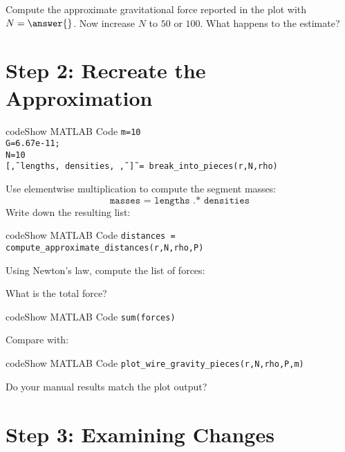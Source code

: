 \documentclass{ximera}
\begin{document}
\begin{problem}
Compute the approximate gravitational force reported in the plot with $N=\answer{}$.  
Now increase $N$ to $50$ or $100$. What happens to the estimate? 
\end{problem}

\section*{Step 2: Recreate the Approximation}

\begin{expandable}{code}{Show MATLAB Code}
\texttt{m=10}\\
\texttt{G=6.67e-11;}\\
\texttt{N=10}\\
\texttt{[\~, lengths, densities, \~, \~] = break\_into\_pieces(r,N,rho)}
\end{expandable}

\begin{problem}
Use elementwise multiplication to compute the segment masses:  
\[
\texttt{masses = lengths .* densities}
\]  
Write down the resulting list: 
\end{problem}

\begin{expandable}{code}{Show MATLAB Code}
\texttt{distances = compute\_approximate\_distances(r,N,rho,P)}
\end{expandable}

\begin{problem}
Using Newton's law, compute the list of forces:

What is the total force? 
\end{problem}

\begin{expandable}{code}{Show MATLAB Code}
\texttt{sum(forces)}
\end{expandable}

Compare with:

\begin{expandable}{code}{Show MATLAB Code}
\texttt{plot\_wire\_gravity\_pieces(r,N,rho,P,m)}
\end{expandable}

\begin{problem}
Do your manual results match the plot output? 
\end{problem}

\section*{Step 3: Examining Changes}
\end{document}
